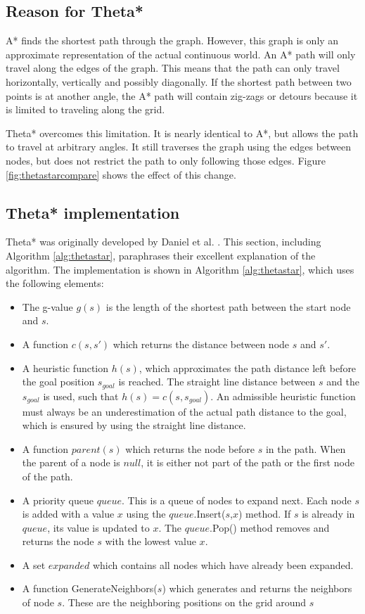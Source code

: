 \subsection{Reason for Theta*}
A* finds the shortest path through the graph. However, this graph is only an approximate representation of the actual continuous world. An A* path will only travel along the edges of the graph. This means that the path can only travel horizontally, vertically and possibly diagonally. If the shortest path between two points is at another angle, the A* path will contain zig-zags or detours because it is limited to traveling along the grid. 
\par
Theta* overcomes this limitation. It is nearly identical to A*, but  allows the path to travel at arbitrary angles. It still traverses the graph using the edges between nodes, but does not restrict the path to only following those edges. Figure \ref{fig:thetastarcompare} shows the effect of this change.




\subsection{Theta* implementation}

Theta* was originally developed by Daniel et al. \cite{Daniel2010}. This section, including Algorithm \ref{alg:thetastar}, paraphrases their excellent explanation of the algorithm. The implementation is shown in Algorithm \ref{alg:thetastar}, which uses the following elements:
\begin{itemize}
\item The g-value $g(s)$ is the length of the shortest path between the start node and $s$.
\item A function $c(s,s')$ which returns the distance between node $s$ and $s'$.
\item A heuristic function $h(s)$, which approximates the path distance left before the goal position $s_{goal}$ is reached. The straight line distance between $s$ and the $s_{goal}$ is used, such that $h(s) = c(s,s_{goal})$. An admissible heuristic function must always be an underestimation of the actual path distance to the goal, which is ensured by using the straight line distance. 
\item A function $parent(s)$ which returns the node before $s$ in the path. When the parent of a node is $null$, it is either not part of the path or the first node of the path.
\item A priority queue $queue$. This is a queue of nodes to expand next. Each node $s$ is added with a value $x$ using the $queue.$Insert($s$,$x$) method. If $s$ is already in $queue$, its value is updated to $x$. The $queue$.Pop() method removes and returns the node $s$ with the lowest value $x$.
\item A set $expanded$ which contains all nodes which have already been expanded.
\item A function GenerateNeighbors($s$) which generates and returns the neighbors of node $s$. These are the neighboring positions on the grid around $s$
\end{itemize}

